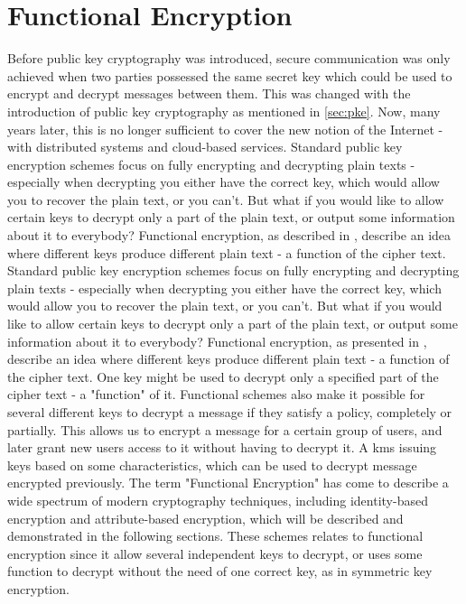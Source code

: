 \section{Functional Encryption}
Before public key cryptography was introduced, secure communication was only achieved when two parties possessed the same secret key which could be used to encrypt and decrypt messages between them. This was changed with the introduction of public key cryptography as mentioned in \ref{sec:pke}. Now, many years later, this is no longer sufficient to cover the new notion of the Internet - with distributed systems and cloud-based services. 
Standard public key encryption
schemes focus on fully encrypting and decrypting plain texts - especially when
decrypting you either have the correct key, which would allow you to recover the
plain text, or you can’t. But what if you would like to allow certain keys to decrypt
only a part of the plain text, or output some information about it to everybody?
Functional encryption, as described in \cite{boneh2012functional}, describe an idea where different keys
produce different plain text - a function of the cipher text. Standard public key encryption schemes focus on fully encrypting and decrypting plain texts - especially when decrypting you either have the correct key, which would allow you to recover the plain text, or you can’t. But what if you would like to allow certain keys to decrypt only a part of the plain text, or output some information about it to everybody? Functional encryption, as presented in \cite{boneh2012functional}, describe an idea where different keys produce different plain text - a function of the cipher text. One key might be used to decrypt only a specified part of the cipher text - a "function" of it. Functional schemes also make it possible for several different keys to decrypt a message if they satisfy a policy, completely or partially. This allows us to encrypt a message for a certain group of users, and later grant new users access to it without having to decrypt it. A \gls{kms} issuing  keys based on some characteristics, which can be used to decrypt message encrypted previously. The term "Functional Encryption" has come to describe a wide spectrum of modern cryptography techniques, including identity-based encryption and attribute-based encryption, which will be described and demonstrated in the following sections. These schemes relates to functional encryption since it allow several independent keys to decrypt, or uses some function to decrypt without the need of one correct key, as in symmetric key encryption.


